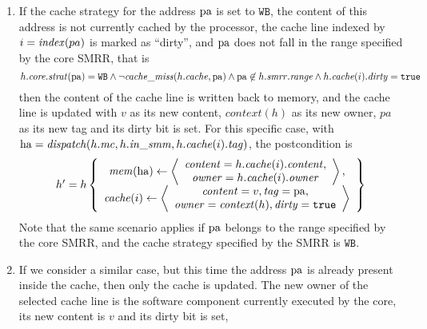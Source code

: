 \begin{enumerate}
\item If the cache strategy for the address \( \mathrm{pa} \) is set to
  \( \mathtt{WB} \), the content of this address is not currently cached by the
  processor, the cache line indexed by \( i = \mathit{index}(pa) \) is marked as
  ``dirty'', and \( \mathrm{pa} \) does not fall in the range specified by the core
  SMRR, that is
  \[
    h.\mathit{core}.\mathit{strat}(\mathrm{pa}) = \mathtt{WB} \wedge \neg
    \mathit{cache\_miss}(h.\mathit{cache}, \mathrm{pa}) \wedge \mathrm{pa} \not\in
    h.\mathit{smrr}.\mathit{range} \wedge h.\mathit{cache}(i).\mathit{dirty} =
    \mathtt{true}
  \]
  then the content of the cache line is written back to memory, and the cache
  line is updated with \( v \) as its new content, \( context(h) \) as its new
  owner, \( pa \) as its new tag and its dirty bit is set.
  For this specific case, with
  \( \mathrm{ha} = \mathit{dispatch}(h.\mathit{mc}, h.\mathit{in\_smm},
  h.\mathit{cache}(i).\mathit{tag}) \), the postcondition is
  \[
    \begin{array}{l}
      h' = h \left\{
      \begin{array}{c}
        \mathit{mem}(\mathrm{ha})
        \leftarrow \left<
        \begin{array}{c}
          \mathit{content} = h.\mathit{cache}(i).\mathit{content}, \\
          \mathit{owner} = h.\mathit{cache}(i).\mathit{owner} \\
        \end{array}
        \right>, \\
        \mathit{cache}(i) \leftarrow \left<
        \begin{array}{c}
          \mathit{content} = v, \mathit{tag} = \mathrm{pa}, \\
          \mathit{owner} = \mathit{context}(h), \mathit{dirty} = \mathtt{true}
        \end{array}
        \right>
      \end{array}
      \right\}
    \end{array}
  \]
  Note that the same scenario applies if \( \mathrm{pa} \) belongs to the range
  specified by the core SMRR, and the cache strategy specified by the SMRR is
  \( \mathtt{WB} \).
\item If we consider a similar case, but this time the address \( \mathrm{pa} \) is
  already present inside the cache, then only the cache is updated.
  The new owner of the selected cache line is the software component currently
  executed by the core, its new content is \( v \) and its dirty bit is set,

\end{enumerate}
